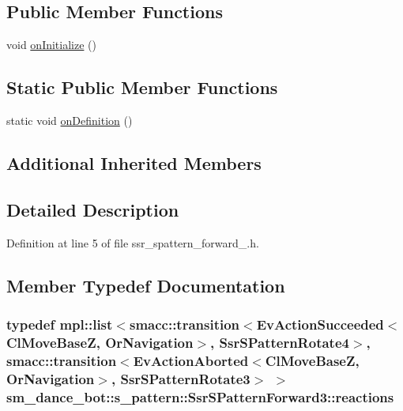\subsection*{Public Member Functions}
\begin{DoxyCompactItemize}
\item 
void \hyperlink{structsm__dance__bot_1_1s__pattern_1_1SsrSPatternForward3_af7315cb108cd75741357102a90c033cb}{on\+Initialize} ()
\end{DoxyCompactItemize}
\subsection*{Static Public Member Functions}
\begin{DoxyCompactItemize}
\item 
static void \hyperlink{structsm__dance__bot_1_1s__pattern_1_1SsrSPatternForward3_ae44c0219ccc9531c3d6e614d363d6569}{on\+Definition} ()
\end{DoxyCompactItemize}
\subsection*{Additional Inherited Members}


\subsection{Detailed Description}


Definition at line 5 of file ssr\+\_\+spattern\+\_\+forward\+\_.\+h.



\subsection{Member Typedef Documentation}
\subsubsection[{\texorpdfstring{reactions}{reactions}}]{\setlength{\rightskip}{0pt plus 5cm}typedef mpl\+::list$<${\bf smacc\+::transition}$<$Ev\+Action\+Succeeded$<${\bf Cl\+Move\+BaseZ}, {\bf Or\+Navigation}$>$, {\bf Ssr\+S\+Pattern\+Rotate4}$>$, {\bf smacc\+::transition}$<$Ev\+Action\+Aborted$<${\bf Cl\+Move\+BaseZ}, {\bf Or\+Navigation}$>$, {\bf Ssr\+S\+Pattern\+Rotate3}$>$ $>$ {\bf sm\+\_\+dance\+\_\+bot\+::s\+\_\+pattern\+::\+Ssr\+S\+Pattern\+Forward3\+::reactions}}\hypertarget{structsm__dance__bot_1_1s__pattern_1_1SsrSPatternForward3_a987f91f910acf4763918bcd6278014e4}{}\label{structsm__dance__bot_1_1s__pattern_1_1SsrSPatternForward3_a987f91f910acf4763918bcd6278014e4}


